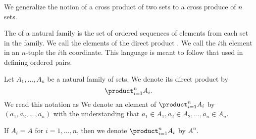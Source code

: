 

We generalize the notion of a cross product of two sets to a cross produce of $n$ sets.


The  of a natural family is the set of ordered sequences of elements from each set in the family.
We call the elements of the direct product .
We call the $i$th element in an $n$-tuple the $i$th coordinate.
This language is meant to follow that used in defining ordered pairs.


Let $A_1, \dots, A_n$ be a natural family
of sets. We denote its direct product by
\[
  \product_{i = 1}^{n} A_{i}.
\]
We read this notation as 
We denote an element of $\product_{i = 1}^{n} A_{i}$ by $(a_1, a_2, \dots, a_n)$ with the understanding that $a_1 \in A_1, a_2 \in A_2, \dots, a_n \in A_n$.

If $A_i = A$ for $i = 1, \dots, n$, then we denote
$\product_{i = 1}^{n} A_{i}$ by $A^n$.


\strats
